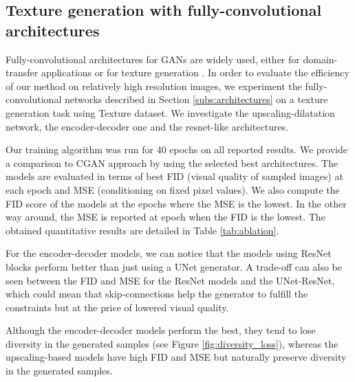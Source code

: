 
\subsection{Texture generation with fully-convolutional architectures}
\label{sub:fcnn}
Fully-convolutional architectures for GANs are widely used, either for domain-transfer applications \citep{Zhu2017}\citep{Isola2016} or for texture generation \citep{Jetchev2017}. In order to evaluate the efficiency of our method on relatively high resolution images, we experiment the fully-convolutional networks described in Section \ref{subs:architectures} on a texture generation task using Texture dataset. We investigate the upscaling-dilatation network, the encoder-decoder one and the resnet-like architectures.

Our training algorithm was run for 40 epochs on all reported results. We provide a comparison to CGAN\citep{Mirza2014} approach by using the selected best architectures.
The models are evaluated in terms of best FID (visual quality of sampled images) at each epoch and MSE (conditioning on fixed pixel values).  We also compute the FID score of the models at the epochs where the MSE is the lowest. In the other way around, the MSE is reported at epoch when the FID is the lowest. The obtained quantitative results are detailed in Table \ref{tab:ablation}.

For the encoder-decoder models, we can notice that the models using ResNet blocks perform better than just using a UNet generator. A trade-off can also be seen between the FID and MSE for the ResNet models and the UNet-ResNet, which could mean that skip-connections help the generator to fulfill the constraints but at the price of lowered visual quality.

Although the encoder-decoder models perform the best, they tend to lose diversity in the generated samples (see Figure \ref{fig:diversity_loss}), whereas the upscaling-based models have high FID and MSE but naturally preserve diversity in the generated samples.

